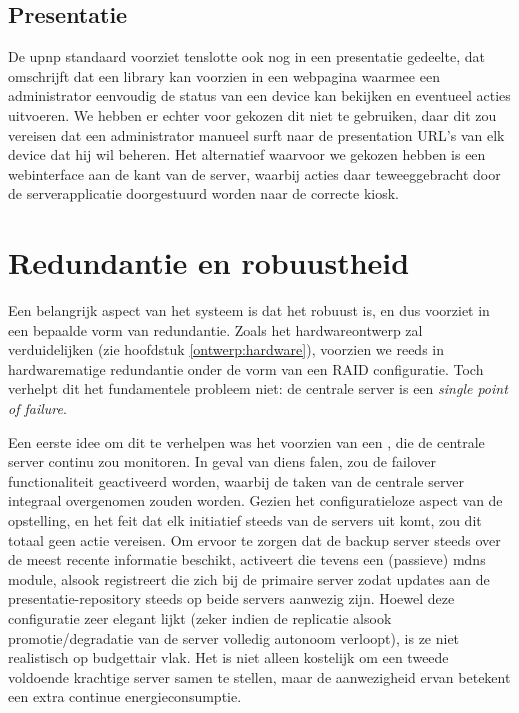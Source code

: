 \subsection{Presentatie}

De \ac{upnp} standaard voorziet tenslotte ook nog in een presentatie gedeelte, dat omschrijft dat een library kan voorzien in een webpagina waarmee een administrator eenvoudig de status van een device kan bekijken en eventueel acties uitvoeren. We hebben er echter voor gekozen dit niet te gebruiken, daar dit zou vereisen dat een administrator manueel surft naar de presentation URL's van elk device dat hij wil beheren. Het alternatief waarvoor we gekozen hebben is een webinterface aan de kant van de server, waarbij acties daar teweeggebracht door de serverapplicatie doorgestuurd worden naar de correcte kiosk.

\section{Redundantie en robuustheid}
\label{sec:redundantie}

Een belangrijk aspect van het systeem is dat het robuust is, en dus voorziet in een bepaalde vorm van redundantie. Zoals het hardwareontwerp zal verduidelijken (zie hoofdstuk \ref{ontwerp:hardware}), voorzien we reeds in hardwarematige redundantie onder de vorm van een RAID configuratie. Toch verhelpt dit het fundamentele probleem niet: de centrale server is een \emph{single point of failure}.

Een eerste idee om dit te verhelpen was het voorzien van een , die de centrale server continu zou monitoren. In geval van diens falen, zou de failover functionaliteit geactiveerd worden, waarbij de taken van de centrale server integraal overgenomen zouden worden. Gezien het configuratieloze aspect van de opstelling, en het feit dat elk initiatief steeds van de servers uit komt, zou dit totaal geen actie vereisen. Om ervoor te zorgen dat de backup server steeds over de meest recente informatie beschikt, activeert die tevens een (passieve) \ac{mdns} module, alsook registreert die zich bij de primaire server zodat updates aan de presentatie-repository steeds op beide servers aanwezig zijn.
Hoewel deze configuratie zeer elegant lijkt (zeker indien de replicatie alsook promotie/degradatie van de server volledig autonoom verloopt), is ze niet realistisch op budgettair vlak. Het is niet alleen kostelijk om een tweede voldoende krachtige server samen te stellen, maar de aanwezigheid ervan betekent een extra continue energieconsumptie.


